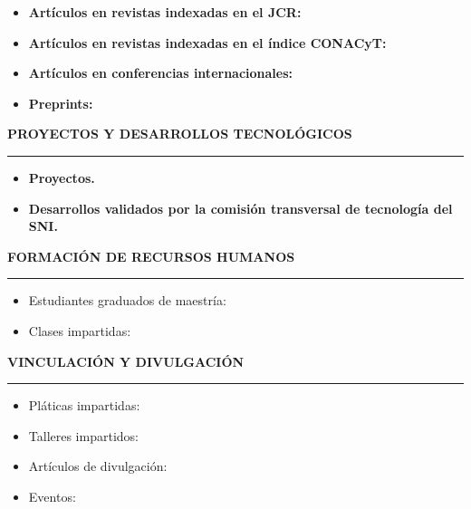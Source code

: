 \documentclass[10pt]{article}
\begin{document}

\begin{itemize}
	\item \textbf{Artículos en revistas indexadas en el JCR:}
	
	
	\item \textbf{Artículos en revistas indexadas en el índice CONACyT:}
	
	
	\item \textbf{Artículos en conferencias internacionales:}
	
	
	\item \textbf{Preprints:}
	
\end{itemize} 

\vspace{0.3cm}
\textbf{PROYECTOS Y DESARROLLOS TECNOLÓGICOS}
\vspace{3pt}
\hrule
\begin{itemize}
	\item \textbf{Proyectos.}
	
	\item \textbf{Desarrollos validados por la comisión transversal de tecnología del SNI.}
	
\end{itemize}


\vspace{0.3cm}
{\bf FORMACIÓN DE RECURSOS HUMANOS}
\vspace{3pt}
\hrule

\begin{itemize}
	\item Estudiantes graduados de maestría:
	
	
	\item Clases impartidas:
	
\end{itemize}


\vspace{0.3cm}
\textbf{VINCULACIÓN Y DIVULGACIÓN}
\vspace{3pt}
\hrule

\begin{itemize}
	\item Pláticas impartidas:
	
	
	\item Talleres impartidos:
	
	
	\item Artículos de divulgación:
	
	
	\item Eventos:
	
\end{itemize}
\end{document}
